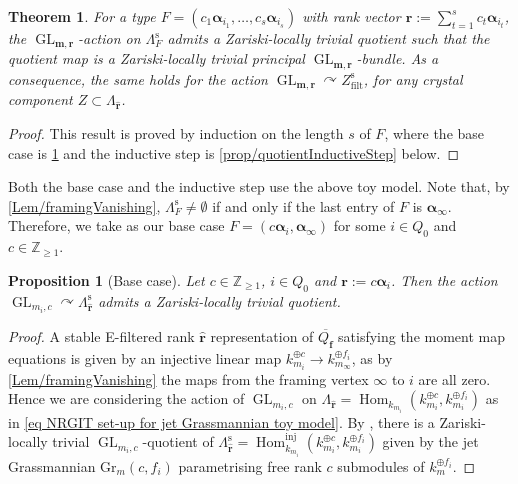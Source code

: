 \documentclass[a4paper,12pt]{article}
\theoremstyle{definition}
\theoremstyle{plain}
\newtheorem{theorem}[definition]{Theorem}
\newtheorem{proposition}[definition]{Proposition}
\theoremstyle{remark}
\DeclareMathOperator{\GL}{GL}
\DeclareMathOperator{\Hom}{Hom}
\newcommand{\st}{\mathrm{s}}
\newcommand\bbZ{\mathbb{Z}}
\newcommand\bfalpha{\bm{\alpha}}
\newcommand\bfm{\mathbf{m}}
\newcommand\bfr{\mathbf{r}}
\begin{document}
\begin{theorem}\label{Thm/quotientConstruction}
For a type $F=(c_1\bfalpha_{i_1},\ldots,c_s\bfalpha_{i_s})$ with rank vector $\bfr:=\sum_{t=1}^sc_t\bfalpha_{i_t}$, the $\GL_{\bfm,\bfr}$-action on $\Lambda_F^\st$ admits a Zariski-locally trivial quotient such that the quotient map is a Zariski-locally trivial principal $\GL_{\bfm,\bfr}$-bundle. As a consequence, the same holds for the action $\GL_{\bfm,\bfr}\curvearrowright Z_{\mathrm{filt}}^\st$, for any crystal component $Z\subset\Lambda_{\widehat{\bfr}}$.
\end{theorem}

\begin{proof}
This result is proved by induction on the length $s$ of $F$, where the base case is \cref{prop/quotientBaseStep} and the inductive step is \cref{prop/quotientInductiveStep} below.
\end{proof}

Both the base case and the inductive step use the above toy model. Note that, by \cref{Lem/framingVanishing}, $\Lambda_F^\st\ne\emptyset$ if and only if the last entry of $F$ is $\bfalpha_{\infty}$. Therefore, we take as our base case $F=(c\bfalpha_i,\bfalpha_\infty)$ for some $i\in Q_0$ and $c\in\bbZ_{\geq1}$.

\begin{proposition}[Base case]\label{prop/quotientBaseStep}
Let $c\in\bbZ_{\geq1}$, $i\in Q_0$ and $\bfr:=c\bfalpha_i$. Then the action $\GL_{m_i,c}\curvearrowright\Lambda_{\widehat{\bfr}}^\st$ admits a Zariski-locally trivial quotient.
\end{proposition}
\begin{proof}
A stable E-filtered rank $\widehat{\bfr}$ representation of $\overline{Q_{\mathbf{f}}}$ satisfying the moment map equations is given by an injective linear map $k_{m_i}^{\oplus c} \rightarrow k_{m_\infty}^{\oplus f_i}$, as by \cref{Lem/framingVanishing} the maps from the framing vertex $\infty$ to $i$ are all zero. Hence we are considering the action of $\GL_{m_i,c}$ on $\Lambda_{\widehat{\bfr}} = \Hom_{k_{m_i}}(k_{m_i}^{\oplus c} , k_{m_i}^{\oplus f_i})$ as in \cref{eq NRGIT set-up for jet Grassmannian toy model}. By \cite[$\S$4.6.1]{HJV25}, 
there is a Zariski-locally trivial $\GL_{m_i,c}$-quotient of $\Lambda^{\st}_{\widehat{\bfr}} = \Hom_{k_{m_i}}^{\mathrm{inj}}(k_{m_i}^{\oplus c} , k_{m_i}^{\oplus f_i})$ given by the jet Grassmannian $\mathrm{Gr}_m(c,f_i)$ parametrising free rank $c$ submodules of $k_m^{\oplus f_i}$. 
\end{proof}
\end{document}

